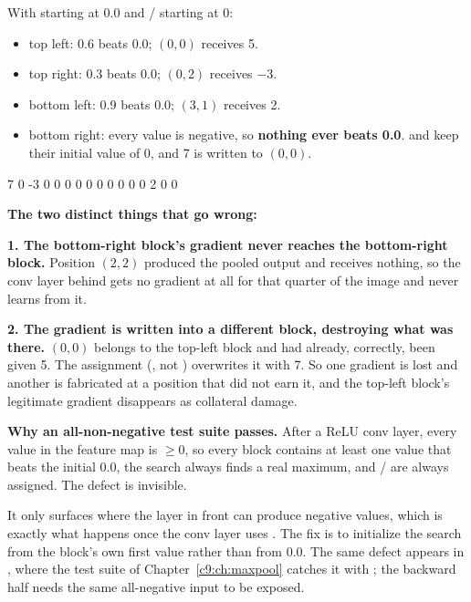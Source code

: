 With  starting at 0.0 and / starting at 0:
\begin{itemize}
  \item top left: 0.6 beats 0.0; $(0,0)$ receives 5.
  \item top right: 0.3 beats 0.0; $(0,2)$ receives $-3$.
  \item bottom left: 0.9 beats 0.0; $(3,1)$ receives 2.
  \item bottom right: every value is negative, so \textbf{nothing ever beats 0.0}.  and
     keep their initial value of 0, and 7 is written to $(0,0)$.
\end{itemize}

\begin{console}
 7    0   -3    0
 0    0    0    0
 0    0    0    0
 0    2    0    0
\end{console}

\textbf{The two distinct things that go wrong:}

\textbf{1. The bottom-right block's gradient never reaches the bottom-right block.} Position $(2,2)$
produced the pooled output and receives nothing, so the conv layer behind gets no gradient at all
for that quarter of the image and never learns from it.

\textbf{2. The gradient is written into a different block, destroying what was there.} $(0,0)$
belongs to the top-left block and had already, correctly, been given 5. The assignment (\code{=},
not \code{+=}) overwrites it with 7. So one gradient is lost and another is fabricated at a position
that did not earn it, and the top-left block's legitimate gradient disappears as collateral damage.

\textbf{Why an all-non-negative test suite passes.} After a ReLU conv layer, every value in the
feature map is $\geq 0$, so every block contains at least one value that beats the initial 0.0, the
search always finds a real maximum, and / are always assigned. The defect
is invisible.

It only surfaces where the layer in front can produce negative values, which is exactly what happens
once the conv layer uses . The fix is to initialize the search from the block's own first
value rather than from 0.0. The same defect appears in , where the test suite of
Chapter~\ref{c9:ch:maxpool} catches it with ; the backward
half needs the same all-negative input to be exposed. 

